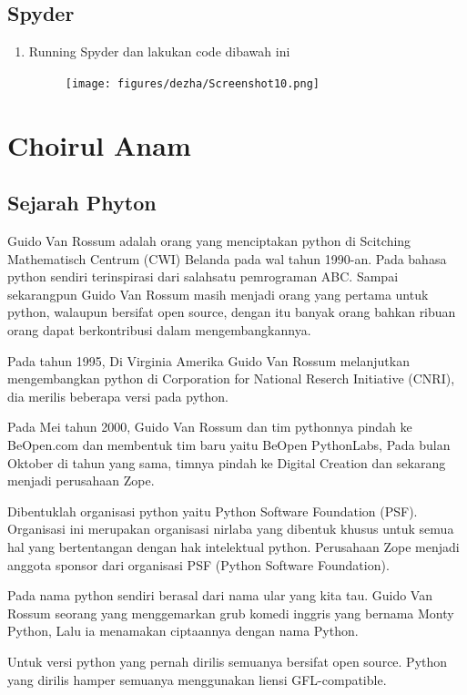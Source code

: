 \subsection{Spyder}
\begin{enumerate}
	\item Running Spyder dan lakukan code dibawah ini
	\begin{figure}[H]
		\centering
		\texttt{[image: figures/dezha/Screenshot10.png]}
		\label{Finish}
		\end{figure}

\end{enumerate}

\section{Choirul Anam}
\subsection{Sejarah Phyton}
Guido Van Rossum adalah orang yang menciptakan python di Scitching Mathematisch Centrum (CWI) Belanda pada wal tahun 1990-an. Pada bahasa python  sendiri terinspirasi dari salahsatu pemrograman ABC. Sampai sekarangpun Guido Van Rossum masih menjadi orang yang pertama untuk python, walaupun bersifat open source, dengan itu banyak orang bahkan ribuan orang dapat berkontribusi dalam mengembangkannya.
\par
Pada tahun 1995, Di Virginia Amerika Guido Van Rossum melanjutkan mengembangkan python di Corporation for National Reserch Initiative (CNRI), dia merilis beberapa versi pada python.
\par
Pada Mei tahun 2000, Guido Van Rossum dan tim pythonnya pindah ke BeOpen.com dan membentuk tim baru yaitu BeOpen PythonLabs, Pada bulan Oktober di tahun yang sama, timnya pindah ke Digital Creation dan sekarang menjadi perusahaan Zope.
\par
Dibentuklah organisasi python yaitu Python Software Foundation (PSF). Organisasi ini merupakan organisasi nirlaba yang dibentuk khusus untuk semua hal yang bertentangan dengan hak intelektual python. Perusahaan Zope menjadi anggota sponsor dari organisasi PSF (Python Software Foundation).
\par
Pada nama python sendiri berasal dari nama ular yang kita tau. Guido Van Rossum seorang yang menggemarkan grub komedi inggris yang bernama Monty Python, Lalu ia menamakan ciptaannya dengan nama Python.
\par
Untuk versi python yang pernah dirilis semuanya bersifat open source. Python yang dirilis hamper semuanya menggunakan liensi GFL-compatible.
